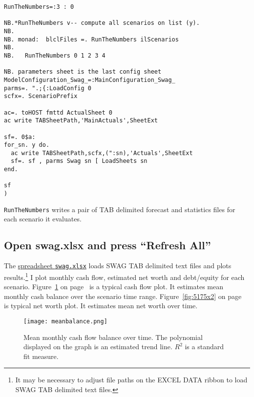 \begin{tcolorbox}[breakable, size=fbox, boxrule=1pt, pad at break*=1mm,colback=cellbackground, colframe=cellborder]
\begin{lstlisting}[language=jdoc, frame=single,framerule=0pt,label=lst:scr5175X0]
RunTheNumbers=:3 : 0

NB.*RunTheNumbers v-- compute all scenarios on list (y).
NB.
NB. monad:  blclFiles =. RunTheNumbers ilScenarios
NB.
NB.   RunTheNumbers 0 1 2 3 4

NB. parameters sheet is the last config sheet
ModelConfiguration_Swag_=:MainConfiguration_Swag_
parms=. ".;{:LoadConfig 0
scfx=. ScenarioPrefix

ac=. toHOST fmttd ActualSheet 0
ac write TABSheetPath,'MainActuals',SheetExt

sf=. 0$a:
for_sn. y do.
  ac write TABSheetPath,scfx,(":sn),'Actuals',SheetExt
  sf=. sf , parms Swag sn [ LoadSheets sn
end.

sf 
)
\end{lstlisting}
\end{tcolorbox}

\noindent \texttt{RunTheNumbers} writes a pair of TAB delimited forecast and
statistics files for each scenario it evaluates.

\subsection*{Open swag.xlsx and press ``Refresh All''}

The \href{https://github.com/bakerjd99/jacks/blob/master/swag/swag.xlsx}{spreadsheet \texttt{swag.xlsx}} 
loads SWAG TAB delimited text files
and plots results.\footnote{It may be necessary to adjust file paths on
  the EXCEL DATA ribbon to load SWAG TAB delimited text files.} I plot
monthly cash flow, estimated net worth and debt/equity for each
scenario. Figure~\ref{fig:5175x1} on page~\pageref{fig:5175x1} is a typical cash flow plot. It estimates mean
monthly cash balance over the scenario time range. Figure~\ref{fig:5175x2} on page~\pageref{fig:5175x2} is typical net worth plot.
It estimates mean net worth over time.


\captionsetup[figure]{labelformat=default}
\begin{figure}[htbp]
\centering
\texttt{[image: meanbalance.png]}
\caption[Mean monthly cash flow balance over time. The polynomial on
the graph is an estimated trend line]{Mean monthly cash flow balance over time. The polynomial displayed on
the graph is an estimated trend line. $R^2$ is a standard fit measure.}
\label{fig:5175x1}
\end{figure}

